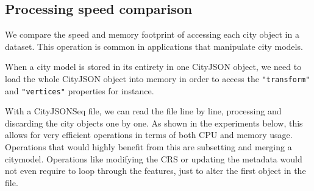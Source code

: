 \documentclass{isprs} %
\begin{document}
\subsection{Processing speed comparison}

We compare the speed and memory footprint of accessing each city object in a dataset.
This operation is common in applications that manipulate city models.

When a city model is stored in its entirety in one CityJSON object, we need to load the whole CityJSON object into memory in order to access the \texttt{"transform"} and \texttt{"vertices"} properties for instance.

With a CityJSONSeq file, we can read the file line by line, processing and discarding the city objects one by one.
As shown in the experiments below, this allows for very efficient operations in terms of both CPU and memory usage.
Operations that would highly benefit from this are subsetting and merging a citymodel.
Operations like modifying the CRS or updating the metadata would not even require to loop through the features, just to alter the first object in the file.

%
\end{document}
